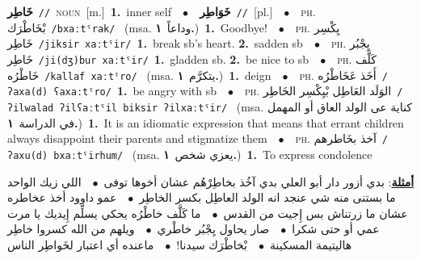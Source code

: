 \documentclass[10pt,a4paper,twoside]{article} %
\begin{document}
\begin{multicols}{2}
{\setlength\topsep{0pt}\textbf{\foreignlanguage{arabic}{خَاطِر}}\ {\color{gray}\texttt{//}\color{black}}\ \textsc{noun}\ [m.]\ \textbf{1.}~inner self\ \ $\bullet$\ \ \setlength\topsep{0pt}\textbf{\foreignlanguage{arabic}{خَوَاطِر}}\ {\color{gray}\texttt{//}\color{black}}\ [pl.]\ \ $\bullet$\ \ \textsc{ph.} \color{gray} \foreignlanguage{arabic}{بْخَاطْرَك}\color{black}\ {\color{gray}\texttt{/{\sffamily bxaːtˤrak}/}\color{black}}\ \color{gray} (msa. \foreignlanguage{arabic}{وداعاً}~\foreignlanguage{arabic}{\textbf{١.}})\color{black}\ \textbf{1.}~Goodbye!\ \ $\bullet$\ \ \textsc{ph.} \color{gray} \foreignlanguage{arabic}{يِكْسِر خَاطِر}\color{black}\ {\color{gray}\texttt{/{\sffamily jiksir xaːtˤir}/}\color{black}}\ \textbf{1.}~break sb's heart.  \textbf{2.}~sadden sb\ \ $\bullet$\ \ \textsc{ph.} \color{gray} \foreignlanguage{arabic}{يِجْبُر خَاطِر}\color{black}\ {\color{gray}\texttt{/{\sffamily ji(dʒ)bur xaːtˤir}/}\color{black}}\ \textbf{1.}~gladden sb.  \textbf{2.}~be nice to sb\ \ $\bullet$\ \ \textsc{ph.} \color{gray} \foreignlanguage{arabic}{كَلَّف خَاطْرُه}\color{black}\ {\color{gray}\texttt{/{\sffamily kallaf xaːtˤro}/}\color{black}}\ \color{gray} (msa. \foreignlanguage{arabic}{يتكرَّم}~\foreignlanguage{arabic}{\textbf{١.}})\color{black}\ \textbf{1.}~deign\ \ $\bullet$\ \ \textsc{ph.} \color{gray} \foreignlanguage{arabic}{أَخَذ عَخَاطْرُه}\color{black}\ {\color{gray}\texttt{/{\sffamily ʔaxa(d) ʕaxaːtˤro}/}\color{black}}\ \textbf{1.}~be angry with sb\ \ $\bullet$\ \ \textsc{ph.} \color{gray} \foreignlanguage{arabic}{الوَلَد العَاطِل بْيِكْسِر الخَاطِر}\color{black}\ {\color{gray}\texttt{/{\sffamily ʔilwalad ʔilʕaːtˤil biksir ʔilxaːtˤir}/}\color{black}}\ \color{gray} (msa. \foreignlanguage{arabic}{كناية عى الولد العاق أو المهمل في الدراسة}~\foreignlanguage{arabic}{\textbf{١.}})\color{black}\ \textbf{1.}~It is an idiomatic expression that means that errant children always disappoint their parents and stigmatize them\ \ $\bullet$\ \ \textsc{ph.} \color{gray} \foreignlanguage{arabic}{آخذ بخَاطرهم}\color{black}\ {\color{gray}\texttt{/{\sffamily ʔaxu(d) bxaːtˤirhum}/}\color{black}}\ \color{gray} (msa. \foreignlanguage{arabic}{يعزي شخص}~\foreignlanguage{arabic}{\textbf{١.}})\color{black}\ \textbf{1.}~To express condolence\  \begin{flushright}\color{gray}\foreignlanguage{arabic}{\textbf{\underline{\foreignlanguage{arabic}{أمثلة}}}: بدي أزور دار أبو العلي بدي آخُذ بخاطِرْهُم عشان أخوها توفى\ $\bullet$\ \  اللي زيك الواحد ما بستنى منه شي عنجد انه الولد العاطِل بكسر الخاطِر\ $\bullet$\ \  عمو داوود أخذ عخاطره عشان ما زرتناش بس إِجيت من القدس\ $\bullet$\ \  ما كَلَّف خاطْرُه  يحكي يسلِّم إِيديك يا مرت عمي أو حتى شكرا\ $\bullet$\ \  صار يحاول يِجْبُر خاطْري\ $\bullet$\ \  ويلهم من الله كسروا خاطِر هاليتيمة المسكينة\ $\bullet$\ \  بْخاطْرَك سيدنا!\ $\bullet$\ \  ماعنده أي اعتبار لخَواطِر الناس}\end{flushright}\color{black}} \vspace{2mm}


\end{multicols}
\end{document}
